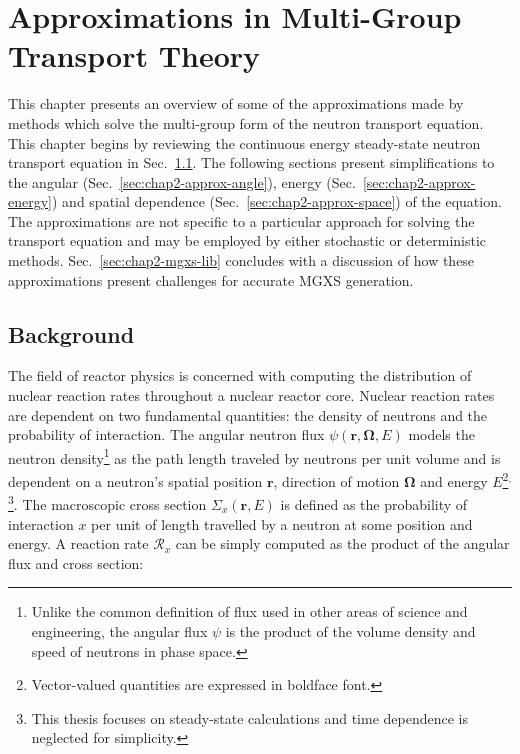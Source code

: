 \chapter{Approximations in Multi-Group Transport Theory}
\label{chap:mgxs}

This chapter presents an overview of some of the approximations made by methods which solve the multi-group form of the neutron transport equation. This chapter begins by reviewing the continuous energy steady-state neutron transport equation in Sec.~\ref{sec:chap2-background}. The following sections present simplifications to the angular (Sec.~\ref{sec:chap2-approx-angle}), energy (Sec.~\ref{sec:chap2-approx-energy}) and spatial dependence (Sec.~\ref{sec:chap2-approx-space}) of the equation. The approximations are not specific to a particular approach for solving the transport equation and may be employed by either stochastic or deterministic methods. Sec.~\ref{sec:chap2-mgxs-lib} concludes with a discussion of how these approximations present challenges for accurate \ac{MGXS} generation.


\section{Background}
\label{sec:chap2-background}

The field of reactor physics is concerned with computing the distribution of nuclear reaction rates throughout a nuclear reactor core. Nuclear reaction rates are dependent on two fundamental quantities: the density of neutrons and the probability of interaction. The angular neutron flux $\psi(\mathbf{r},\mathbf{\Omega},E)$ models the neutron density\footnote{Unlike the common definition of flux used in other areas of science and engineering, the angular flux $\psi$ is the product of the volume density and speed of neutrons in phase space.} as the path length traveled by neutrons per unit volume and is dependent on a neutron's spatial position $\mathbf{r}$, direction of motion $\mathbf{\Omega}$ and energy $E$\footnote{Vector-valued quantities are expressed in boldface font.}$^{,}$\footnote{This thesis focuses on steady-state calculations and time dependence is neglected for simplicity.}. The macroscopic cross section $\Sigma_{x}(\mathbf{r},E)$ is defined as the probability of interaction $x$ per unit of length travelled by a neutron at some position and energy. A reaction rate $\mathcal{R}_{x}$ can be simply computed as the product of the angular flux and cross section:

